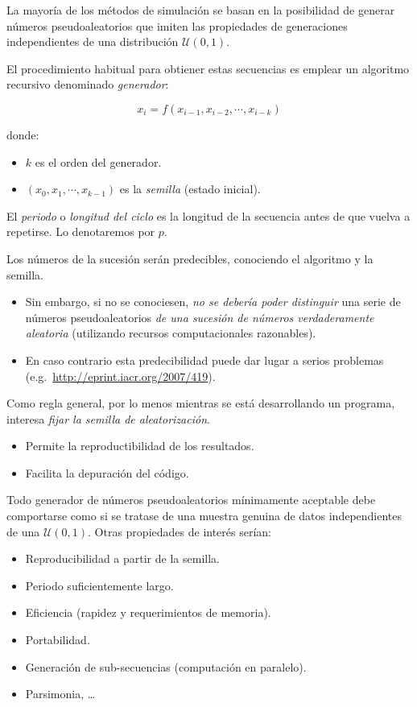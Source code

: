\documentclass[
]{book}
\theoremstyle{break}
\theoremstyle{definition}
\theoremstyle{definition}
\theoremstyle{definition}
\theoremstyle{remark}
\begin{document}
La mayoría de los métodos de simulación se basan en la posibilidad de generar números pseudoaleatorios que imiten las propiedades de generaciones independientes de una distribución \(\mathcal{U}(0,1)\).

El procedimiento habitual para obtiener estas secuencias es emplear un algoritmo recursivo denominado \emph{generador}:

\[x_{i} = f\left( x_{i-1}, x_{i-2}, \cdots, x_{i-k}\right)\]

donde:

\begin{itemize}
\item
  \(k\) es el orden del generador.
\item
  \(\left( x_{0},x_{1},\cdots,x_{k-1}\right)\) es la \emph{semilla}
  (estado inicial).
\end{itemize}

El \emph{periodo} o \emph{longitud del ciclo} es la longitud de la secuencia antes
de que vuelva a repetirse. Lo denotaremos por \(p\).

Los números de la sucesión serán predecibles, conociendo el
algoritmo y la semilla.

\begin{itemize}
\item
  Sin embargo, si no se conociesen, \emph{no se debería poder distinguir} una serie de números pseudoaleatorios \emph{de una sucesión de números verdaderamente aleatoria} (utilizando recursos computacionales razonables).
\item
  En caso contrario esta predecibilidad puede dar lugar a serios
  problemas (e.g.~\url{http://eprint.iacr.org/2007/419}).
\end{itemize}

Como regla general, por lo menos mientras se está desarrollando un
programa, interesa \emph{fijar la semilla de aleatorización}.

\begin{itemize}
\item
  Permite la reproductibilidad de los resultados.
\item
  Facilita la depuración del código.
\end{itemize}

Todo generador de números pseudoaleatorios mínimamente aceptable
debe comportarse como si se tratase de una muestra genuina de datos
independientes de una \(\mathcal{U}(0,1)\).
Otras propiedades de interés serían:

\begin{itemize}
\item
  Reproducibilidad a partir de la semilla.
\item
  Periodo suficientemente largo.
\item
  Eficiencia (rapidez y requerimientos de memoria).
\item
  Portabilidad.
\item
  Generación de sub-secuencias (computación en paralelo).
\item
  Parsimonia, \ldots{}
\end{itemize}
\end{document}

